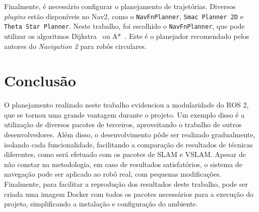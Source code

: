 \documentclass[repeatfields,xlists,xpacks,oneside,yearsonly]{ufrgscca}
\begin{document}
Finalmente, é necessário configurar o planejamento de trajetórias.
Diversos \textit{plugins}  estão disponíveis no Nav2,
como o \texttt{NavFnPlanner}, \texttt{Smac Planner 2D} e \texttt{Theta Star Planner}.
Neste trabalho, foi escolhido o \texttt{NavFnPlanner}, que pode utilizar
os algoritmos Dijkstra~\cite{dijkstra} ou A*~\cite{astar}.
Este é o planejador recomendado pelos autores do \textit{Navigation 2}
para robôs circulares.

\chapter{Conclusão}
\label{conclusao}

O planejamento realizado neste trabalho evidenciou a modularidade do ROS 2,
que se tornou uma grande vantagem durante o projeto.
Um exemplo disso é a utilização de diversos pacotes de terceiros,
aproveitando o trabalho de outros desenvolvedores.
Além disso, o desenvolvimento pôde ser realizado gradualmente,
isolando cada funcionalidade, facilitando a comparação
de resultados de técnicas diferentes, como será efetuado com os pacotes de SLAM
e VSLAM.
Apesar de não constar na metodologia, em caso de resultados satisfatórios,
o sistema de navegação pode ser aplicado ao robô real, com pequenas
modificações.
Finalmente, para facilitar a reprodução dos resultados deste trabalho,
pode ser criada uma imagem Docker com todos os pacotes necessários para
a execução do projeto, simplificando a instalação e configuração do ambiente.


\printbibliography

%
%
%
\end{document}
